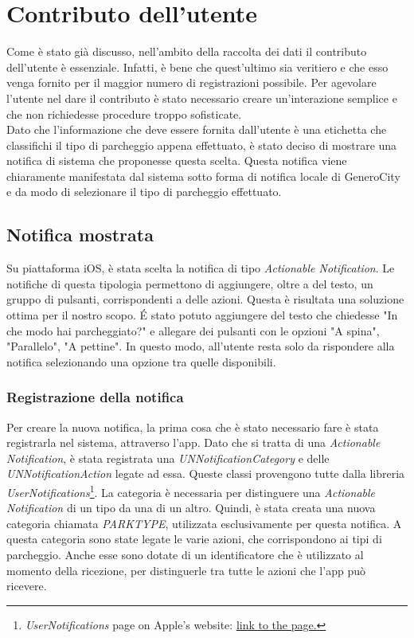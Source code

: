 \chapter{Contributo dell'utente}

Come è stato già discusso, nell'ambito della raccolta dei dati il contributo dell'utente
è essenziale. Infatti, è bene che quest'ultimo sia veritiero e che esso venga fornito per
il maggior numero di registrazioni possibile. Per agevolare l'utente nel dare il contributo
è stato necessario creare un'interazione semplice e che non richiedesse procedure troppo 
sofisticate.\\
Dato che l'informazione che deve essere fornita dall'utente è una etichetta che classifichi
il tipo di parcheggio appena effettuato, è stato deciso di mostrare una notifica di sistema
che proponesse questa scelta. Questa notifica viene chiaramente manifestata dal sistema
sotto forma di notifica locale di GeneroCity e da modo di selezionare il tipo di parcheggio
effettuato.

\section{Notifica mostrata}

Su piattaforma iOS, è stata scelta la notifica di tipo \emph{Actionable Notification}.
Le notifiche di questa tipologia permettono di aggiungere, oltre a del testo, un gruppo 
di pulsanti, corrispondenti a delle azioni. Questa è risultata una soluzione ottima per 
il nostro scopo. \'E stato potuto aggiungere del testo che chiedesse "In che modo hai
parcheggiato?" e allegare dei pulsanti con le opzioni "A spina", "Parallelo", "A pettine".
In questo modo, all'utente resta solo da rispondere alla notifica selezionando una 
opzione tra quelle disponibili.

\subsection{Registrazione della notifica}

Per creare la nuova notifica, la prima cosa che è stato necessario fare è stata registrarla
nel sistema, attraverso l'app. Dato che si tratta di una \emph{Actionable Notification},
è stata registrata una \emph{UNNotificationCategory} e delle \emph{UNNotificationAction}
legate ad essa. Queste classi provengono tutte dalla libreria \emph{UserNotifications}\footnote{
\emph{UserNotifications} page on Apple's website: 
\href{https://developer.apple.com/documentation/usernotifications}{\underline{link to the page.}}}. 
La categoria è necessaria per distinguere una \emph{Actionable Notification}
di un tipo da una di un altro. Quindi, è stata creata una nuova categoria chiamata 
\emph{PARKTYPE}, utilizzata esclusivamente per questa notifica. A questa categoria sono 
state legate le varie azioni, che corrispondono ai tipi di parcheggio. Anche esse sono
dotate di un identificatore che è utilizzato al momento della ricezione, per distinguerle
tra tutte le azioni che l'app può ricevere.

